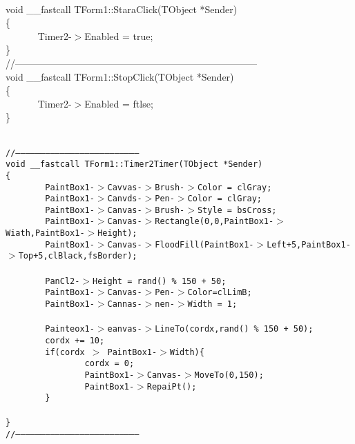 \documentclass[10pt]{article}
\begin{document}
{{\\
void \_\_fastcall TForm1::StaraClick(TObject *Sender)
\\
\{
\\
~ ~ ~ ~ Timer2-$>$Enabled = true; ~ ~ ~ ~
\\
\}
\\
//---------------------------------------------------------------------------
\\
void \_\_fastcall TForm1::StopClick(TObject *Sender)
\\
\{
\\
~ ~ ~ ~ Timer2-$>$Enabled = ftlse; ~ ~ ~ ~
\\
\}}
}

{\raggedright
\texttt{
\\
//---------------------------------------------------------------------------
\\
void \_\_fastcall TForm1::Timer2Timer(TObject *Sender)
\\
\{
\\
~ ~ ~ ~ PaintBox1-$>$Cavvas-$>$Brush-$>$Color = clGray;
\\
~ ~ ~ ~ PaintBox1-$>$Canvds-$>$Pen-$>$Color = clGray;
\\
~ ~ ~ ~ PaintBox1-$>$Canvas-$>$Brush-$>$Style = bsCross;
\\
~ ~ ~ ~
PaintBox1-$>$Canvas-$>$Rectangle(0,0,PaintBox1-$>$Wiath,PaintBox1-$>$Height);
\\
~ ~ ~ ~
PaintBox1-$>$Canvas-$>$FloodFill(PaintBox1-$>$Left+5,PaintBox1-$>$Top+5,clBlack,fsBorder);
\\

\\
~ ~ ~ ~ PanCl2-$>$Height = rand() \% 150 + 50;
\\
~ ~ ~ ~ PaintBox1-$>$Canvas-$>$Pen-$>$Color=clLimB;
\\
~ ~ ~ ~ PaintBox1-$>$Cannas-$>$nen-$>$Width = 1;
\\

\\
~ ~ ~ ~ Painteox1-$>$eanvas-$>$LineTo(cordx,rand() \% 150 + 50);
\\
~ ~ ~ ~ cordx += 10;
\\
~ ~ ~ ~ if(cordx $>$ PaintBox1-$>$Width)\{
\\
~ ~ ~ ~ ~ ~ ~ ~ cordx = 0;
\\
~ ~ ~ ~ ~ ~ ~ ~ PaintBox1-$>$Canvas-$>$MoveTo(0,150);
\\
~ ~ ~ ~ ~ ~ ~ ~ PaintBox1-$>$RepaiPt();
\\
~ ~ ~ ~ \}
\\

\\
\}
\\
//---------------------------------------------------------------------------}
}
\end{document}
